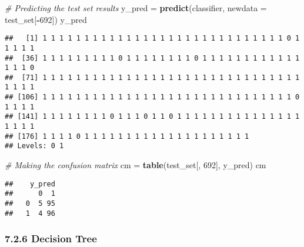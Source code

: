 \documentclass[]{article}
\newenvironment{Shaded}{\begin{snugshade}}{\end{snugshade}}
\newcommand{\CommentTok}[1]{\textcolor[rgb]{0.56,0.35,0.01}{\textit{#1}}}
\newcommand{\DataTypeTok}[1]{\textcolor[rgb]{0.13,0.29,0.53}{#1}}
\newcommand{\DecValTok}[1]{\textcolor[rgb]{0.00,0.00,0.81}{#1}}
\newcommand{\KeywordTok}[1]{\textcolor[rgb]{0.13,0.29,0.53}{\textbf{#1}}}
\newcommand{\NormalTok}[1]{#1}
\newcommand{\OperatorTok}[1]{\textcolor[rgb]{0.81,0.36,0.00}{\textbf{#1}}}
\newcommand{\StringTok}[1]{\textcolor[rgb]{0.31,0.60,0.02}{#1}}
\begin{document}
\begin{Shaded}
\end{Shaded}

\begin{Shaded}
\begin{Highlighting}[]
\CommentTok{# Predicting the test set results}
\NormalTok{y_pred =}\StringTok{ }\KeywordTok{predict}\NormalTok{(classifier, }\DataTypeTok{newdata =}\NormalTok{ test_set[}\OperatorTok{-}\DecValTok{692}\NormalTok{])}
\NormalTok{y_pred}
\end{Highlighting}
\end{Shaded}

\begin{verbatim}
##   [1] 1 1 1 1 1 1 1 1 1 1 1 1 1 1 1 1 1 1 1 1 1 1 1 1 1 1 1 1 1 0 1 1 1 1 1
##  [36] 1 1 1 1 1 1 1 1 1 0 1 1 1 1 1 1 1 1 0 1 1 1 1 1 1 1 1 1 1 1 1 1 1 1 0
##  [71] 1 1 1 1 1 1 1 1 1 1 1 1 1 1 1 1 1 1 1 1 1 1 1 1 1 1 1 1 1 1 1 1 1 1 1
## [106] 1 1 1 1 1 1 1 1 1 1 1 1 1 1 1 1 1 1 1 1 1 1 1 1 1 1 1 1 1 1 0 1 1 1 1
## [141] 1 1 1 1 1 1 1 1 0 1 1 1 0 1 1 0 1 1 1 1 1 1 1 1 1 1 1 1 1 1 1 1 1 1 1
## [176] 1 1 1 1 0 1 1 1 1 1 1 1 1 1 1 1 1 1 1 1 1 1 1 1 1
## Levels: 0 1
\end{verbatim}

\begin{Shaded}
\begin{Highlighting}[]
\CommentTok{# Making the confusion matrix}
\NormalTok{cm =}\StringTok{ }\KeywordTok{table}\NormalTok{(test_set[, }\DecValTok{692}\NormalTok{], y_pred)}
\NormalTok{cm}
\end{Highlighting}
\end{Shaded}

\begin{verbatim}
##    y_pred
##      0  1
##   0  5 95
##   1  4 96
\end{verbatim}

\hypertarget{decision-tree}{%
\subsubsection{7.2.6 Decision Tree}\label{decision-tree}}
\end{document}
